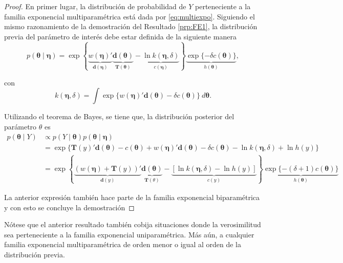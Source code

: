\documentclass[
  10pt,
  spanish,
]{book}
\theoremstyle{definition}
\theoremstyle{definition}
\theoremstyle{definition}
\theoremstyle{definition}
\theoremstyle{remark}
\begin{document}
\begin{proof}
{}En primer lugar, la distribución de probabilidad de \(Y\) perteneciente a la familia exponencial multiparamétrica está dada por \eqref{eq:multiexpo}. Siguiendo el mismo razonamiento de la demostración del Resultado \ref{prp:FE1}, la distribución previa del parámetro de interés debe estar definida de la siguiente manera
\begin{equation}
p(\boldsymbol \theta\mid \boldsymbol \eta)=\exp\left\{\underbrace{w(\boldsymbol \eta)'}_{\mathbf{d}(\boldsymbol \eta)}
\underbrace{\mathbf{d}(\boldsymbol \theta)}_{\mathbf{T}(\boldsymbol \theta)} - \underbrace{\ln k(\boldsymbol \eta,\delta)}_{c(\boldsymbol \eta)}\right\}\underbrace{\exp\{-\delta c(\boldsymbol \theta)\}}_{h(\boldsymbol \theta)},
\end{equation}

con
\begin{equation*}
k(\boldsymbol \eta,\delta)=\int\exp\{w(\boldsymbol \eta)'\mathbf{d}(\boldsymbol \theta)-\delta c(\boldsymbol \theta)\} \ d\boldsymbol \theta.
\end{equation*}

Utilizando el teorema de Bayes, se tiene que, la distribución posterior del parámetro \(\theta\) es
\begin{align*}
p(\boldsymbol \theta\mid Y) &\propto p(Y \mid \boldsymbol \theta)p(\boldsymbol \theta\mid \boldsymbol \eta)\\
&= \exp\{\mathbf{T}(y)'\mathbf{d}(\boldsymbol \theta) - c(\boldsymbol \theta) + w(\boldsymbol \eta)' \mathbf{d}(\boldsymbol \theta) - \delta c(\boldsymbol \theta) - \ln k(\boldsymbol \eta,\delta) +\ln h(y)\}\\
& =
\exp\left\{\underbrace{(w(\boldsymbol \eta)+\mathbf{T}(y))'}_{\mathbf{d}(y)}
\underbrace{\mathbf{d}(\boldsymbol \theta)}_{\mathbf{T}(\theta)} - \underbrace{\left[\ln k(\boldsymbol \eta,\delta)-\ln h(y)\right]}_{c(y)}\right\}\underbrace{\exp\{-(\delta+1)c(\boldsymbol \theta)\}}_{h(\boldsymbol \theta)}
\end{align*}

La anterior expresión también hace parte de la familia exponencial biparamétrica y con esto se concluye la demostración
\end{proof}

Nótese que el anterior resultado también cobija situaciones donde la
verosimilitud sea perteneciente a la familia exponencial uniparamétrica.
Más aún, a cualquier familia exponencial multiparamétrica de orden menor
o igual al orden de la distribución previa.
\end{document}
